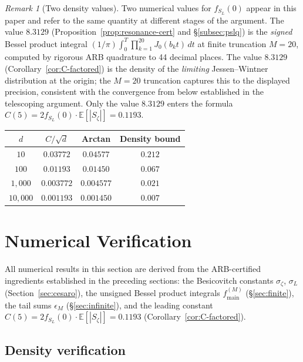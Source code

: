 \documentclass[12pt,reqno]{amsart}
\theoremstyle{plain}
\theoremstyle{definition}
\theoremstyle{remark}
\newtheorem{remark}[theorem]{Remark}
\newcommand{\E}{\mathbb{E}}
\begin{document}
\begin{remark}[Two density values]\label{rem:two-densities}
Two numerical values for $f_{S_L}(0)$ appear in this paper and refer to the same quantity at different stages of the argument.  The value $8.3129$ (Proposition~\ref{prop:resonance-cert} and
\S\ref{subsec:pslq}) is the \emph{signed} Bessel product integral
$(1/\pi)\int_0^T \prod_{k=1}^{20} J_0(b_k t)\,dt$ at finite truncation $M = 20$,
computed by rigorous ARB quadrature to 44 decimal places.  The value $8.3129$ (Corollary~\ref{cor:C-factored}) is
the density of the \emph{limiting} Jessen--Wintner distribution at the origin; the $M = 20$
truncation captures this to the displayed precision, consistent with the convergence from below established in the telescoping
argument.
Only the value $8.3129$ enters the formula $C(5) = 2f_{S_L}(0)\cdot\E[|S_\zeta|] = 0.1193$.
\end{remark}
\begin{center}
\renewcommand{\arraystretch}{1.1}
\begin{tabular}{cccc}
\toprule
$d$ & $C/\sqrt{d}$ & Arctan & Density bound \\
\midrule
$10$ & $0.03772$ & $0.04577$ & $0.212$ \\
$100$ & $0.01193$ & $0.01450$ & $0.067$ \\
$1{,}000$ & $0.003772$ & $0.004577$ & $0.021$ \\
$10{,}000$ & $0.001193$ & $0.001450$ & $0.007$ \\
\bottomrule
\end{tabular}
\end{center}


\section{Numerical Verification}\label{sec:numerics}

All numerical results in this section are derived from the ARB-certified ingredients established in the preceding sections: the Besicovitch constants $\sigma_\zeta$, $\sigma_L$ (Section~\ref{sec:cesaro}), the unsigned Bessel product integrals $f_{\mathrm{main}}^{(M)}$ (\S\ref{sec:finite}), the tail sums $\epsilon_M$ (\S\ref{sec:infinite}), and the leading constant $C(5) = 2f_{S_L}(0)\cdot\E[|S_\zeta|] = 0.1193$ (Corollary~\ref{cor:C-factored}).


\subsection{Density verification}
\end{document}
